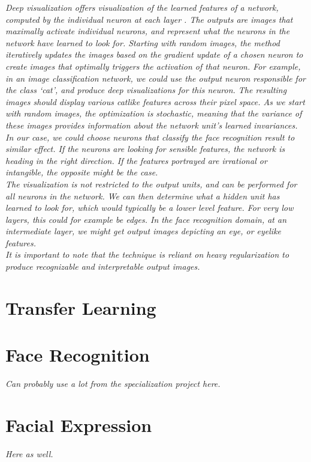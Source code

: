\textit{Deep visualization offers visualization of the learned features of a network, computed by the individual neuron at each layer \cite{deepvis, deepvis_web}. The outputs are images that maximally activate individual neurons, and represent what the neurons in the network have learned to look for. Starting with random images, the method iteratively updates the images based on the gradient update of a chosen neuron to create images that optimally triggers the activation of that neuron. For example, in an image classification network, we could use the output neuron responsible for the class ‘cat’, and produce deep visualizations for this neuron. The resulting images should display various catlike features across their pixel space. As we start with random images, the optimization is stochastic, meaning that the variance of these images provides information about the network unit’s learned invariances. In our case, we could choose neurons that classify the face recognition result to similar effect. If the neurons are looking for sensible features, the network is heading in the right direction. If the features portrayed are irrational or intangible, the opposite might be the case.} \\ 

\noindent \textit{The visualization is not restricted to the output units, and can be performed for all neurons in the network. We can then determine what a hidden unit has learned to look for, which would typically be a lower level feature. For very low layers, this could for example be edges. In the face recognition domain, at an intermediate layer, we might get output images depicting an eye, or eyelike features.} \\

\noindent \textit{It is important to note that the technique is reliant on heavy regularization to produce recognizable and interpretable output images.}

\section{Transfer Learning}

\section{Face Recognition}

\textit{Can probably use a lot from the specialization project here.}

\section{Facial Expression}

\textit{Here as well.}

\cleardoublepage